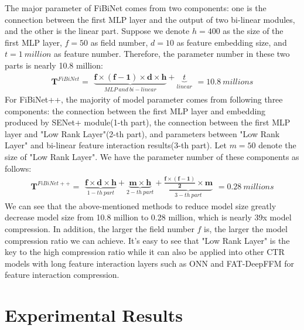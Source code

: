 \documentclass[sigconf]{acmart}
\begin{document}
The major parameter of FiBiNet comes from two components: one is the connection between the first MLP layer and the output of two bi-linear modules, and the other is the linear part. Suppose we denote $h=400$ as the size of the first MLP layer, $f=50$ as field number, $d=10$ as feature embedding size, and  $t=1 \ million$ as feature number. Therefore, the parameter number in these two parts is nearly 10.8 million:
\begin{equation}
  \mathbf{T}^{FiBiNet} = \begin{matrix} \underbrace{ \mathbf{f}\times (\mathbf{f-1}) \times \mathbf{d} \times \mathbf{h} }_{MLP \ and \ bi-linear}+ \underbrace{ t }_{ linear  } \end{matrix}=10.8 \ millions
\end{equation}
For FiBiNet++, the majority of model parameter comes from following three components: the connection between the first MLP layer and embedding produced by SENet+ module(1-th part), the connection between the first MLP layer and "Low Rank Layer"(2-th part), and parameters between "Low Rank Layer" and bi-linear feature interaction results(3-th part). Let $m=50$ denote the size of "Low Rank Layer". We have the parameter number of these components as follows:
\begin{equation}
  \mathbf{T}^{FiBiNet++} = \begin{matrix} \underbrace{ \mathbf{f}\times  \mathbf{d} \times \mathbf{h} }_{1-th \ part}+ \underbrace{\mathbf{m} \times \mathbf{h}  }_{ 2-th \ part  } + \underbrace{\mathbf{\frac{\mathbf{f}\times (\mathbf{f-1}) }{2} }\times \mathbf{m}  }_{ 3-th \ part }\end{matrix}=0.28 \ millions
\end{equation}
We can see that the above-mentioned methods to reduce model size greatly decrease model size from 10.8 million to 0.28 million, which is nearly 39x model compression. In addition, the larger the field number $f$ is, the larger the model compression ratio we can achieve. It's easy to see that "Low Rank Layer" is the key to the high compression ratio  while it can also be applied into other CTR models with long feature interaction layers such as ONN\cite{onn} and FAT-DeepFFM\cite{fat} for feature interaction compression.

\section{Experimental Results}
\end{document}
